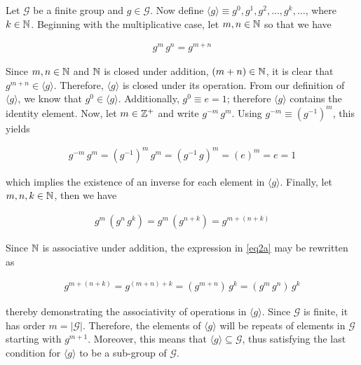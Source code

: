 \documentclass[../CryptoFinal.tex]{subfiles}
\begin{document}
\begin{flushleft}



 Let $\mathcal{G}$ be a finite group and $g \in \mathcal{G}$.  Now define $\langle g \rangle \equiv g^0, g^1, g^2, \dots, g^k, \dots$, where $k \in \mathbb{N}$.  Beginning with the multiplicative case, let $m, n \in \mathbb{N}$ so that we have

\begin{align*}
  g^m \, g^n = g^{m + n}
\end{align*}

Since $m, n \in \mathbb{N}$ and $\mathbb{N}$ is closed under addition, $\left( m + n \right) \in \mathbb{N}$, it is clear that $g^{m + n} \in \langle g \rangle$.  Therefore, $\langle g \rangle$ is closed under its operation.  From our definition of $\langle g \rangle$, we know that $g^0 \in \langle g \rangle$.  Additionally, $g^0 \equiv e = 1$; therefore $\langle g \rangle$ contains the identity element.  Now, let $m \in \mathbb{Z}^+$ and write $g^{-m} \, g^m$.  Using $g^{-m} \equiv \left( g^{-1} \right)^m$, this yields

\begin{align*}
  g^{-m} \, g^m = \left( g^{-1} \right)^m \, g^m = \left( g^{-1} \, g \right)^m = \left( e \right)^m = e = 1
\end{align*}

which implies the existence of an inverse for each element in $\langle g \rangle$.  Finally, let $m, n, k \in \mathbb{N}$, then we have

\begin{align}
  g^m \, \left( g^n \, g^k \right) = g^m \, \left( g^{n + k} \right) = g^{m + \left( n + k \right)} \label{eq2a}
\end{align}

Since $\mathbb{N}$ is associative under addition, the expression in \ref{eq2a} may be rewritten as

\begin{align*}
  g^{m + \left( n + k \right)} = g^{\left( m + n \right) + k} = \left( g^{m + n} \right) \, g^k = \left( g^m \, g^n \right) \, g^k
\end{align*}

thereby demonstrating the associativity of operations in $\langle g \rangle$.  Since $\mathcal{G}$ is finite, it has order $m = \lvert \mathcal{G} \rvert$.  Therefore, the elements of $\langle g \rangle$ will be repeats of elements in $\mathcal{G}$ starting with $g^{m + 1}$.  Moreover, this means that $\langle g \rangle \subseteq \mathcal{G}$, thus satisfying the last condition for $\langle g \rangle$ to be a sub-group of $\mathcal{G}$. \newline


\end{flushleft}
\end{document}
